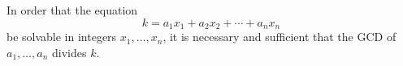 In order that the equation
$$k = a_1 x_1 + a_2 x_2 + \cdots + a_n x_n$$
be solvable in integers $x_1, \ldots, x_n$, it is necessary and sufficient that the GCD of $a_1, \ldots, a_n$ divides $k$.
